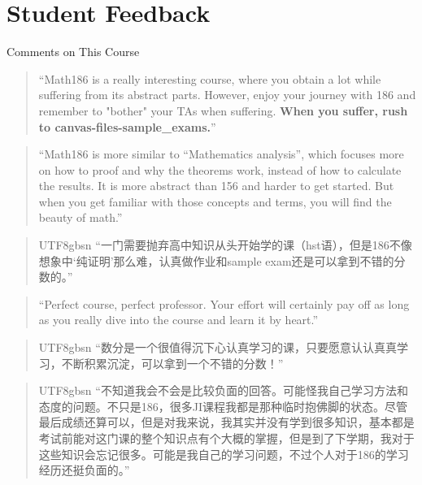 \documentclass[dvipsnames]{beamer}
\begin{document}
\section{Student Feedback}
\begin{frame}[allowframebreaks]{Comments on This Course}
    \begin{quote}
        \color{NavyBlue}
    ``Math186 is a really interesting course, where you obtain a lot while suffering from its abstract parts. However, enjoy your journey with 186 and remember to "bother" your TAs when suffering. \textbf{When you suffer, rush to canvas-files-sample\_exams.}''
    \end{quote}
    \vspace{0.5em}
    \begin{quote}
        \color{Emerald}
    ``Math186 is more similar to ``Mathematics analysis'', which focuses more on how to proof and why the theorems work, instead of how to calculate the results. It is more abstract than 156 and harder to get started. But when you get familiar with those concepts and terms, you will find the beauty of math.''
    \end{quote}
    \vspace{0.5em}
    \begin{quote}
        \normalfont
        \color{NavyBlue}
        \begin{CJK}{UTF8}{gbsn}
    “一门需要抛弃高中知识从头开始学的课（hst语），但是186不像想象中‘纯证明’那么难，认真做作业和sample exam还是可以拿到不错的分数的。”
    \end{CJK}
    \end{quote}
    \vspace{0.5em}
    \begin{quote}
        \color{Emerald}
    ``Perfect course, perfect professor. Your effort will certainly pay off as long as you really dive into the course and learn it by heart.''
    \end{quote}
    \vspace{0.5em}
    \begin{quote}
        \normalfont
        \color{NavyBlue}
        \begin{CJK}{UTF8}{gbsn}
    “数分是一个很值得沉下心认真学习的课，只要愿意认认真真学习，不断积累沉淀，可以拿到一个不错的分数！”
    \end{CJK}
    \end{quote}
    \vspace{0.5em}
    \begin{quote}
        \normalfont
        \color{Emerald}
        \begin{CJK}{UTF8}{gbsn}
    “不知道我会不会是比较负面的回答。可能怪我自己学习方法和态度的问题。不只是186，很多JI课程我都是那种临时抱佛脚的状态。尽管最后成绩还算可以，但是对我来说，我其实并没有学到很多知识，基本都是考试前能对这门课的整个知识点有个大概的掌握，但是到了下学期，我对于这些知识会忘记很多。可能是我自己的学习问题，不过个人对于186的学习经历还挺负面的。”
        \end{CJK}
    \end{quote}
\end{frame}
\end{document}

